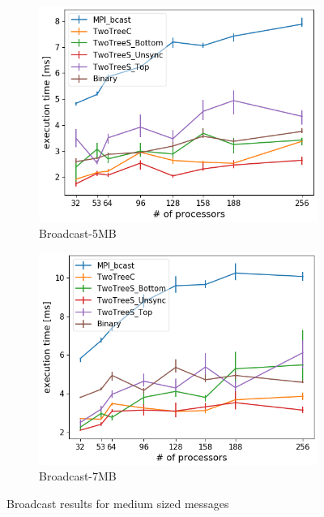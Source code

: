 \documentclass[sigplan,review,anonymous]{acmart}\settopmatter{printfolios=true,printccs=false,printacmref=false}
\begin{document}
\begin{figure}
\centering
\begin{subfigure}{.25\textwidth}
  \centering
  \includegraphics[width=1\linewidth]{images/Results/bcastFinal_5242880B.png}
  \caption{Broadcast-5MB}
  \label{bcast-selected-5MB}
\end{subfigure}%
\begin{subfigure}{.25\textwidth}
  \centering
  \includegraphics[width=1\linewidth]{images/Results/bcastFinal_7340032B.png}
  \caption{Broadcast-7MB}
  \label{bcast-selected-7MB}
\end{subfigure}
\caption{Broadcast results for medium sized messages}
\label{graph-bcast-medium2-selected}
\end{figure}
\end{document}
